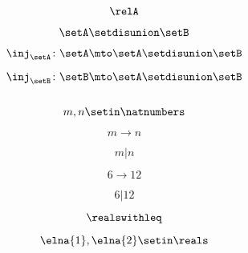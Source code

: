 {\begin{forslides}
    \begin{equation}
        \label{eq:combination-120}
        \relA
    \end{equation}

    \begin{equation}
        \label{eq:combination-121}
        \setA \setdisunion \setB
    \end{equation}

    \begin{equation}
        \label{eq:combination-122}
        \inj_\setA\colon \setA\mto \setA \setdisunion\setB
    \end{equation}

    \begin{equation}
        \label{eq:combination-123}
        \inj_\setB\colon \setB\mto \setA \setdisunion\setB
    \end{equation}

    \begin{equation}
        \label{eq:combination-124}
    \end{equation}

    \begin{equation}
        \label{eq:combination-125}
        m,n\setin \natnumbers
    \end{equation}

    \begin{equation}
        \label{eq:combination-126}
        m\to n
    \end{equation}

    \begin{equation}
        \label{eq:combination-127}
        m | n
    \end{equation}

    \begin{equation}
        \label{eq:combination-128}
        6\to 12
    \end{equation}

    \begin{equation}
        \label{eq:combination-129}
        6 | 12
    \end{equation}

    \begin{equation}
        \label{eq:combination-130}
        \realswithleq
    \end{equation}

    \begin{equation}
        \label{eq:combination-131}
        \elna{1},\elna{2}\setin \reals
    \end{equation}


\end{forslides}}
